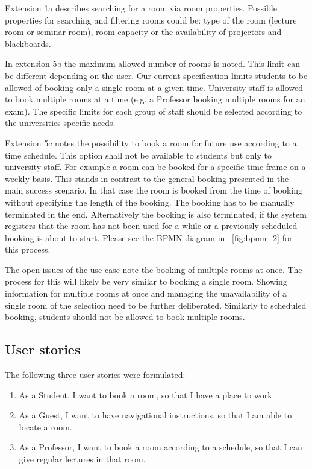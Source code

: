 \documentclass[article,onecolumn]{IEEEtran}
\begin{document}
Extension 1a describes searching for a room via room properties.
Possible properties for searching and filtering rooms could be: type of the room (lecture room or seminar room), room capacity or the availability of projectors and blackboards.

In extension 5b the maximum allowed number of rooms is noted. This limit can be different depending on the user. Our current specification limits students to be allowed of booking only a single room at a given time. University staff is allowed to book multiple rooms at a time (e.g. a Professor booking multiple rooms for an exam). The specific limits for each group of staff should be selected according to the universities specific needs.

Extension 5c notes the possibility to book a room for future use according to a time schedule. This option shall not be available to students but only to university staff. For example a room can be booked for a specific time frame on a weekly basis.
This stands in contrast to the general booking presented in the main success scenario. In that case the room is booked from the time of booking without specifying the length of the booking. The booking has to be manually terminated in the end. Alternatively the booking is also terminated, if the system registers that the room has not been used for a while or a previously scheduled booking is about to start. Please see the BPMN diagram in \figurename~\ref{fig:bpmn_2} for this process.

The open issues of the use case note the booking of multiple rooms at once.
The process for this will likely be very similar to booking a single room. Showing information for multiple rooms at once and managing the unavailability of a single room of the selection need to be further deliberated. Similarly to scheduled booking, students should not be allowed to book multiple rooms.

\newpage %

\subsection{User stories}

The following three user stories were formulated:

\begin{enumerate}
	\item As a Student, I want to book a room, so that I have a place to work.
	\item As a Guest, I want to have navigational instructions, so that I am able to locate a room.
	\item As a Professor, I want to book a room according to a schedule, so that I can give regular lectures in that room.
\end{enumerate}
\end{document}
